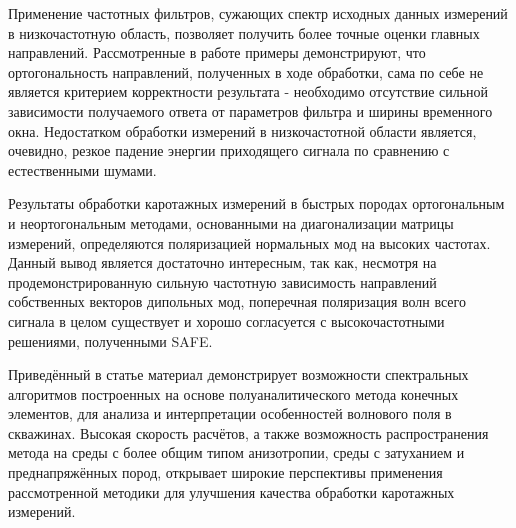 \documentclass[a4paper,11pt]{article}
\begin{document}
Применение частотных фильтров, сужающих спектр исходных данных измерений в низкочастотную область, позволяет получить более точные оценки главных направлений. Рассмотренные в работе примеры демонстрируют, что ортогональность направлений, полученных в ходе обработки, сама по себе не является критерием корректности результата - необходимо отсутствие сильной зависимости получаемого ответа от параметров фильтра и ширины временного окна. Недостатком обработки измерений в низкочастотной области является, очевидно, резкое падение энергии приходящего сигнала по сравнению с естественными шумами.

Результаты обработки каротажных измерений в быстрых породах ортогональным и неортогональным методами, основанными на диагонализации матрицы измерений, определяются поляризацией нормальных мод на высоких частотах. Данный вывод является достаточно интересным, так как, несмотря на продемонстрированную сильную частотную зависимость направлений собственных векторов дипольных мод, поперечная поляризация волн всего сигнала в целом существует и хорошо согласуется с высокочастотными решениями, полученными SAFE. 


Приведённый в статье материал демонстрирует возможности спектральных алгоритмов построенных на основе полуаналитического метода конечных элементов, для анализа и интерпретации особенностей волнового поля в скважинах. Высокая скорость расчётов, а также возможность распространения метода на среды с более общим типом анизотропии, среды с затуханием и преднапряжённых пород, открывает широкие перспективы применения рассмотренной методики для улучшения качества обработки каротажных измерений. 

\clearpage

%
%

%


%
\end{document}
